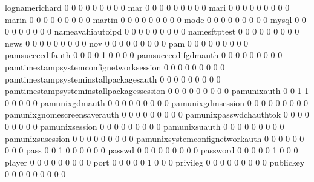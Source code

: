 \documentclass[compress,8pt]{beamer}
\begin{document}
\begin{frame}
\begin{Schunk}
  lognamerichard                             0   0   0   0   0   0   0   0   0
  mar                                        0   0   0   0   0   0   0   0   0
  mari                                       0   0   0   0   0   0   0   0   0
  marin                                      0   0   0   0   0   0   0   0   0
  martin                                     0   0   0   0   0   0   0   0   0
  mode                                       0   0   0   0   0   0   0   0   0
  mysql                                      0   0   0   0   0   0   0   0   0
  nameavahiautoipd                           0   0   0   0   0   0   0   0   0
  namesftptest                               0   0   0   0   0   0   0   0   0
  news                                       0   0   0   0   0   0   0   0   0
  nov                                        0   0   0   0   0   0   0   0   0
  pam                                        0   0   0   0   0   0   0   0   0
  pamsucceedifauth                           0   0   0   0   1   0   0   0   0
  pamsucceedifgdmauth                        0   0   0   0   0   0   0   0   0
  pamtimestampsystemconfignetworksession     0   0   0   0   0   0   0   0   0
  pamtimestampsysteminstallpackagesauth      0   0   0   0   0   0   0   0   0
  pamtimestampsysteminstallpackagessession   0   0   0   0   0   0   0   0   0
  pamunixauth                                0   0   1   1   0   0   0   0   0
  pamunixgdmauth                             0   0   0   0   0   0   0   0   0
  pamunixgdmsession                          0   0   0   0   0   0   0   0   0
  pamunixgnomescreensaverauth                0   0   0   0   0   0   0   0   0
  pamunixpasswdchauthtok                     0   0   0   0   0   0   0   0   0
  pamunixsession                             0   0   0   0   0   0   0   0   0
  pamunixsuauth                              0   0   0   0   0   0   0   0   0
  pamunixsusession                           0   0   0   0   0   0   0   0   0
  pamunixsystemconfignetworkauth             0   0   0   0   0   0   0   0   0
  pass                                       0   0   1   0   0   0   0   0   0
  passwd                                     0   0   0   0   0   0   0   0   0
  password                                   0   0   0   0   0   1   0   0   0
  player                                     0   0   0   0   0   0   0   0   0
  port                                       0   0   0   0   0   1   0   0   0
  privileg                                   0   0   0   0   0   0   0   0   0
  publickey                                  0   0   0   0   0   0   0   0   0

\end{Schunk}
\end{frame}
\end{document}
